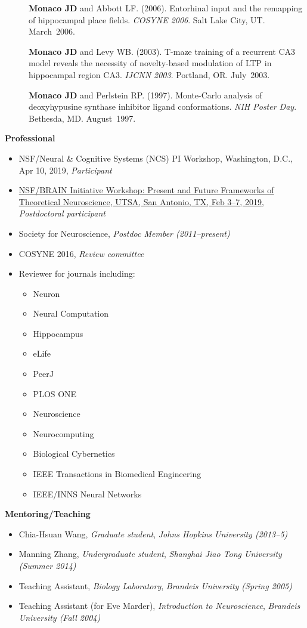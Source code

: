 \documentclass[10pt]{article}
\begin{document}
\begin{description}
\item[\quad] \textbf{Monaco JD} and Abbott LF. (2006). Entorhinal input and the remapping of hippocampal place fields. \emph{COSYNE 2006}. Salt Lake City, UT. March~2006.
\item[\quad] \textbf{Monaco JD} and Levy WB. (2003). T-maze training of a recurrent CA3 model reveals the necessity of novelty-based modulation of LTP in hippocampal region CA3. \emph{IJCNN 2003}. Portland, OR. July~2003.
\item[\quad] \textbf{Monaco JD} and Perlstein RP. (1997). Monte-Carlo analysis of deoxyhypusine synthase inhibitor ligand conformations. \emph{NIH Poster Day}. Bethesda, MD. August~1997.
\end{description}

{\large \textbf{Professional}}
\begin{itemize}
  \item NSF/Neural \& Cognitive Systems (NCS) PI Workshop, Washington, D.C., Apr 10, 2019, \emph{Participant}
  \item \href{https://www.utsa.edu/SantamariaLab/Workshop/index.html}{NSF/BRAIN Initiative Workshop: Present and Future Frameworks of Theoretical Neuroscience, UTSA, San Antonio, TX, Feb 3--7, 2019}, \emph{Postdoctoral participant}
  \item Society for Neuroscience, \emph{Postdoc Member (2011--present)}
  \item COSYNE 2016, \emph{Review committee}
  \item Reviewer for journals including:
  \begin{itemize}
    \item Neuron
    \item Neural Computation
    \item Hippocampus
    \item eLife
    \item PeerJ
    \item PLOS ONE
    \item Neuroscience
    \item Neurocomputing
    \item Biological Cybernetics
    \item IEEE Transactions in Biomedical Engineering
    \item IEEE/INNS Neural Networks
  \end{itemize}
\end{itemize}

{\large \textbf{Mentoring/Teaching}}
\begin{itemize}
  \item Chia-Hsuan Wang, \emph{Graduate student}, \emph{Johns Hopkins University (2013--5)}
  \item Manning Zhang, \emph{Undergraduate student}, \emph{Shanghai Jiao Tong University (Summer 2014)}
  \item Teaching Assistant, \emph{Biology Laboratory}, \emph{Brandeis University (Spring 2005)}
  \item Teaching Assistant (for Eve Marder), \emph{Introduction to Neuroscience}, \emph{Brandeis University (Fall 2004)}
\end{itemize}
\end{document}
